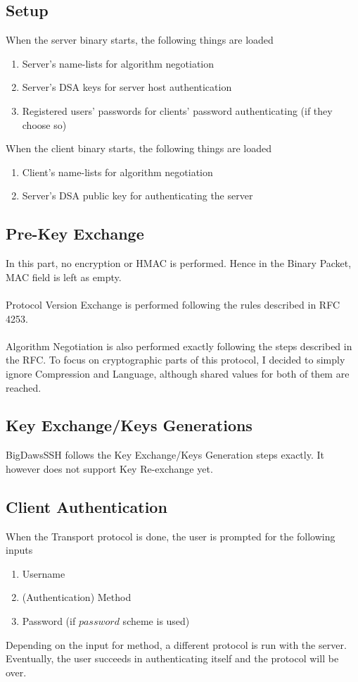 \documentclass[10pt,sigconf]{acmart}
\begin{document}
\subsection{Setup}
When the server binary starts, the following things are loaded \begin{enumerate}
  \item Server's name-lists for algorithm negotiation
  \item Server's DSA keys for server host authentication
  \item Registered users' passwords for clients' password authenticating (if they choose so)
\end{enumerate}
When the client binary starts, the following things are loaded \begin{enumerate}
  \item Client's name-lists for algorithm negotiation
  \item Server's DSA public key for authenticating the server
\end{enumerate}
\subsection{Pre-Key Exchange}
In this part, no encryption or HMAC is performed. Hence in the Binary Packet, MAC field is left as empty. \\\\
Protocol Version Exchange is performed following the rules described in RFC 4253. \\\\
Algorithm Negotiation is also performed exactly following the steps described in the RFC. To focus on cryptographic parts of this protocol, I decided to simply ignore Compression and Language, although shared values for both of them are reached.
\subsection{Key Exchange/Keys Generations}
BigDawsSSH follows the Key Exchange/Keys Generation steps exactly. It however does not support Key Re-exchange yet. 
\subsection{Client Authentication}
When the Transport protocol is done, the user is prompted for the following inputs \begin{enumerate}
  \item Username 
  \item (Authentication) Method
  \item Password (if $password$ scheme is used)
\end{enumerate}
Depending on the input for method, a different protocol is run with the server. Eventually, the user succeeds in authenticating itself and the protocol will be over.
\end{document}
